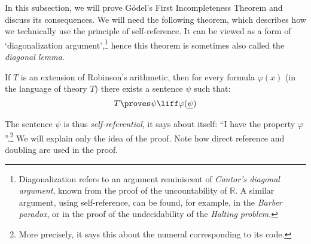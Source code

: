     In this subsection, we will prove Gödel's First Incompleteness Theorem and discuss its consequences. We will need the following theorem, which describes how we technically use the principle of self-reference. It can be viewed as a form of `diagonalization argument',\footnote{Diagonalization refers to an argument reminiscent of \emph{Cantor's diagonal argument}, known from the proof of the uncountability of $\mathbb R$. A similar argument, using self-reference, can be found, for example, in the \emph{Barber paradox}, or in the proof of the undecidability of the \emph{Halting problem}.} hence this theorem is sometimes also called the \emph{diagonal lemma}.
    
    \begin{theorem}
    If $T$ is an extension of Robinson's arithmetic, then for every formula $\varphi(x)$ (in the language of theory $T$) there exists a sentence $\psi$ such that:
    $$
    T\proves \psi \liff \varphi(\underline{\psi})
    $$
    \end{theorem}
    The sentence $\psi$ is thus \emph{self-referential}, it says about itself: ``I have the property $\varphi$''.\footnote{More precisely, it says this about the numeral corresponding to its code.} We will explain only the idea of the proof. Note how direct reference and doubling are used in the proof.
